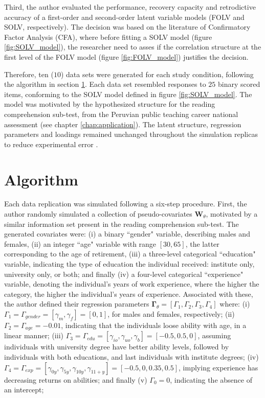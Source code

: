 Third, the author evaluated the performance, recovery capacity and retrodictive accuracy of a first-order and second-order latent variable models (FOLV and SOLV, respectively). The decision was based on the literature of Confirmatory Factor Analysis (CFA), where before fitting a SOLV model (figure \ref{fig:SOLV_model}), the researcher need to asses if the correlation structure at the first level of the FOLV model (figure \ref{fig:FOLV_model}) justifies the decision.

Therefore, ten ($10$) data sets were generated for each study condition, following the algorithm in section \ref{sub_sect:algorithm}. Each data set resembled responses to $25$ binary scored items, conforming to the SOLV model defined in figure \ref{fig:SOLV_model}. The model was motivated by the hypothesized structure for the reading comprehension sub-test, from the Peruvian public teaching career national assessment (see chapter \ref{chap:application}). The latent structure, regression parameters and loadings remained unchanged throughout the simulation replicas to reduce experimental error \cite{Kieftenbeld_et_al_2012}. 


\section{Algorithm} \label{sub_sect:algorithm}

Each data replication was simulated following a six-step procedure. First, the author randomly simulated a collection of pseudo-covariates $\mathbf{W}_{\theta}$, motivated by a similar information set present in the reading comprehension sub-test. The generated covariates were: (i) a binary ``gender" variable, describing males and females, (ii) an integer ``age" variable with range $[30, 65]$, the latter corresponding to the age of retirement, (iii) a three-level categorical ``education" variable, indicating the type of education the individual received: institute only, university only, or both; and finally (iv) a four-level categorical ``experience" variable, denoting the individual's years of work experience, where the higher the category, the higher the individual's years of experience. Associated with these, the author defined their regression parameters $\mathbf{\Gamma}_{\theta} = [\Gamma_{1}, \Gamma_{2}, \Gamma_{3}, \Gamma_{4}]$ where: (i) $\Gamma_{1} = \Gamma_{gender} = [\gamma_{m}, \gamma_{f}] = [0, 1]$, for males and females, respectively; (ii) $\Gamma_{2} = \Gamma_{age} = -0.01$, indicating that the individuals loose ability with age, in a linear manner; (iii) $\Gamma_{3} = \Gamma_{edu} = [\gamma_{io}, \gamma_{uo}, \gamma_{b}] = [-0.5, 0.5, 0]$, assuming individuals with university degree have better ability levels, followed by individuals with both educations, and last individuals with institute degrees; (iv) $\Gamma_{4} = \Gamma_{exp} = [\gamma_{0y}, \gamma_{5y}, \gamma_{10y}, \gamma_{11+y}] = [-0.5, 0, 0.35, 0.5]$, implying experience has decreasing returns on abilities; and finally (v) $\Gamma_{0} = 0$, indicating the absence of an intercept;  

